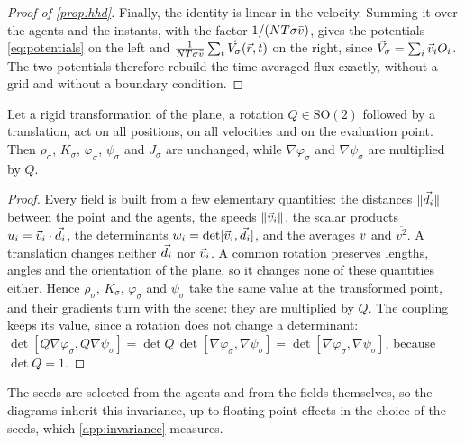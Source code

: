 \begin{proof}[Proof of \cref{prop:hhd}]
Finally, the identity is linear in the velocity. Summing it over the agents and the instants, with the
factor $1/(NT\sigma\bar v)$, gives the potentials \eqref{eq:potentials} on the left and
$\frac{1}{NT\sigma\bar v}\sum_t\vec{V}_\sigma(\vec{r},t)$ on the right, since $\vec{V}_\sigma=\sum_i\vec{v}_iO_i$. The two
potentials therefore rebuild the time-averaged flux exactly, without a grid and without a boundary
condition.
\end{proof}

\begin{proposition}[Invariance]\label{prop:so2}
Let a rigid transformation of the plane, a rotation $Q\in\mathrm{SO}(2)$ followed by a translation, act
on all positions, on all velocities and on the evaluation point. Then $\rho_\sigma$, $K_\sigma$, $\varphi_\sigma$,
$\psi_\sigma$ and $J_\sigma$ are unchanged, while $\nabla\varphi_\sigma$ and $\nabla\psi_\sigma$
are multiplied by $Q$.
\end{proposition}
\begin{proof}
Every field is built from a few elementary quantities: the distances $\|\vec{d}_i\|$ between the point and
the agents, the speeds $\|\vec{v}_i\|$, the scalar products $u_i=\vec{v}_i\cdot\vec{d}_i$, the determinants
$w_i=\det[\vec{v}_i,\vec{d}_i]$, and the averages $\bar v$ and $\overline{v^2}$. A translation changes neither $\vec{d}_i$
nor $\vec{v}_i$. A common rotation preserves lengths, angles and the orientation of the plane, so it changes
none of these quantities either. Hence $\rho_\sigma$, $K_\sigma$, $\varphi_\sigma$ and $\psi_\sigma$ take
the same value at the transformed point, and their gradients turn with the scene: they are multiplied
by $Q$. The coupling keeps its value, since a rotation does not change a determinant:
$\det[Q\nabla\varphi_\sigma,Q\nabla\psi_\sigma]=\det Q\,\det[\nabla\varphi_\sigma,\nabla\psi_\sigma]
=\det[\nabla\varphi_\sigma,\nabla\psi_\sigma]$, because $\det Q=1$.
\end{proof}
The seeds are selected from the agents and from the fields themselves, so the diagrams inherit this
invariance, up to floating-point effects in the choice of the seeds, which \cref{app:invariance}
measures.

